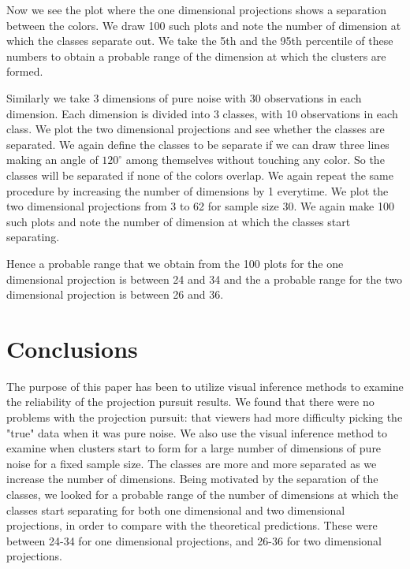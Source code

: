 \documentclass[12]{report}
\begin{document}
 
Now we see the plot where the one dimensional projections shows a separation between the colors. We draw 100 such plots and note the number of dimension at which the classes separate out. We take the 5th and the 95th percentile of these numbers to obtain a probable range of the dimension at which the clusters are formed.

Similarly we take 3 dimensions of pure noise with 30 observations in each dimension. Each dimension is divided into 3 classes, with 10 observations in each class. We plot the two dimensional projections and see whether the classes are separated. We again define the classes to be separate if we can draw three lines making an angle of $120^{\circ}$ among themselves without touching any color. So the classes will be separated if none of the colors overlap. We again repeat the same procedure by increasing the number of dimensions by 1 everytime. We plot the two dimensional projections from 3 to 62 for sample size 30. We again make 100 such plots and note the number of dimension at which the classes start separating. 


Hence a probable range that we obtain from the 100 plots for the one dimensional projection is between 24 and 34 and the a probable range for the two dimensional projection is between 26 and 36. 

\section{Conclusions}

The purpose of this paper has been to utilize  visual inference methods to examine the reliability of the projection pursuit results. We found that there were no problems with the projection pursuit: that viewers had more difficulty picking the "true" data when it was pure noise. We also use the visual inference method to examine when clusters start to form for a large number of dimensions of pure noise for a fixed sample size. The classes are more and more separated as we increase the number of dimensions. Being motivated by the separation of the classes, we looked for a probable range of the number of dimensions at which the classes start separating for both one dimensional and two dimensional projections, in order to compare with the theoretical predictions. These were between 24-34 for one dimensional projections, and 26-36 for two dimensional projections.
\end{document}
